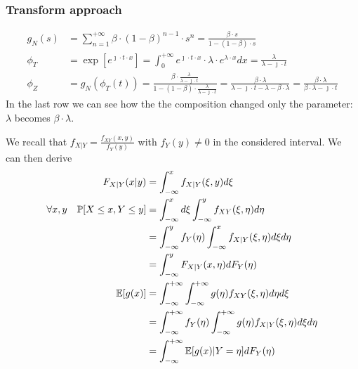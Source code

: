\subsubsection{Transform approach}
\begin{equation}
  \begin{split}
  g_N(s)&=\sum \limits_{n=1}^{+\infty} \beta \cdot (1-\beta)^{n-1}\cdot s^n = \frac{\beta \cdot s}{1-(1-\beta)\cdot s}\\
  \phi_T&=\exp[e^{\jmath \cdot t \cdot x}] = \int_{0}^{+\infty} e^{\jmath \cdot t \cdot x} \cdot \lambda \cdot e^{ \lambda \cdot x} dx = \frac{\lambda}{\lambda - \jmath \cdot t} \\
  \phi_Z &= g_N(\phi_T(t))=\frac{\beta \cdot \frac{\lambda}{\lambda - \jmath \cdot t}}{1-(1-\beta)\cdot \frac{\lambda}{\lambda - \jmath \cdot t}} =
   \frac{\beta \cdot \lambda}{\lambda - \jmath \cdot t -\lambda - \beta \cdot \lambda} = \frac{\beta \cdot \lambda}{\beta \cdot \lambda - \jmath \cdot t}
  \end{split}
\end{equation}
In the last row we can see how the the composition changed only the parameter: $\lambda$ becomes $\beta \cdot \lambda$.

We recall that $f_{X|Y} = \frac{f_{XY}(x,y)}{f_Y(y)}$ with $f_Y(y)\neq 0$ in the considered interval.
We can then derive
\begin{equation}
  \begin{split}
  F_{X|Y}(x|y) &= \int_{-\infty}^{x}f_{X|Y}(\xi,y)d\xi\\
  \forall x,y \quad \mathbb{P}[X \le x , Y \le y] &= \int_{-\infty}^{x}d\xi \int_{-\infty}^{y}f_{XY}(\xi,\eta) d\eta\\
  &=\int_{-\infty}^{y}f_Y(\eta) \int_{-\infty}^{x}f_{X|Y}(\xi,\eta) d\xi d\eta \\
  &=\int_{-\infty}^{y}F_{X|Y}(x,\eta) dF_Y(\eta)\\
  \mathbb{E}[g(x)] &= \int_{-\infty}^{+\infty} \int_{-\infty}^{+\infty}g(\eta) f_{XY}(\xi,\eta) d\eta  d\xi \\
  &= \int_{-\infty}^{+\infty} f_Y(\eta) \int_{-\infty}^{+\infty}g(\eta) f_{X|Y}(\xi,\eta)   d\xi d\eta \\
  &= \int_{-\infty}^{+\infty}\mathbb{E}[g(x)|Y=\eta] dF_Y(\eta)
  \end{split}
\end{equation}
